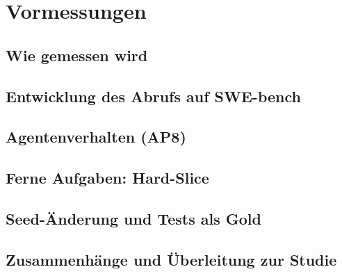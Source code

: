 
\chapter{Vormessungen}
\label{chap:vormessungen}

\section{Wie gemessen wird}%
\label{sec:wie-gemessen}

\section{Entwicklung des Abrufs auf SWE-bench}%
\label{sec:entwicklung-swebench}

\section{Agentenverhalten (AP8)}%
\label{sec:agentenverhalten}

\section{Ferne Aufgaben: Hard-Slice}%
\label{sec:hard-slice}

\section{Seed-Änderung und Tests als Gold}%
\label{sec:seed-aenderung}

\section{Zusammenhänge und Überleitung zur Studie}%
\label{sec:ueberleitung-studie}
